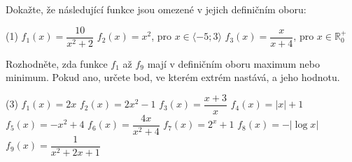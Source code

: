 \documentclass[12pt,a4paper]{article}
\begin{document}
\begin{exercise}
    Dokažte, že následující funkce jsou omezené v jejich definičním oboru:
    \begin{tasks}(1)
        \task \(f_{1}(x)=\dfrac{10}{x^{2}+2}\)
        \task \(f_{2}(x)=x^{2}\), \; pro \(x\in\langle-5;3\rangle\)
        \task \(f_{3}(x)=\dfrac{x}{x+4}\), \; pro \(x\in\mathbb{R}^{+}_{0}\)
    \end{tasks}
\end{exercise}


\setcounter{section}{6}
\begin{exercise}
    Rozhodněte, zda funkce \(f_{1}\) až \(f_{9}\) mají v definičním oboru maximum nebo minimum. Pokud ano, určete bod, ve kterém extrém nastává, a jeho hodnotu.
    \begin{tasks}(3)
        \task \(f_{1}(x)=2x\)
        \task \(f_{2}(x)=2x^{2}-1\)
        \task \(f_{3}(x)=\dfrac{x+3}{x}\)
        \task \(f_{4}(x)=|x|+1\)
        \task \(f_{5}(x)=-x^{2}+4\)
        \task \(f_{6}(x)=\dfrac{4x}{x^{2}+4}\)
        \task \(f_{7}(x)=2^{x}+1\)
        \task \(f_{8}(x)=-|\log x|\)
        \task \(f_{9}(x)=\dfrac{1}{x^{2}+2x+1}\)
    \end{tasks}
\end{exercise}
\end{document}
